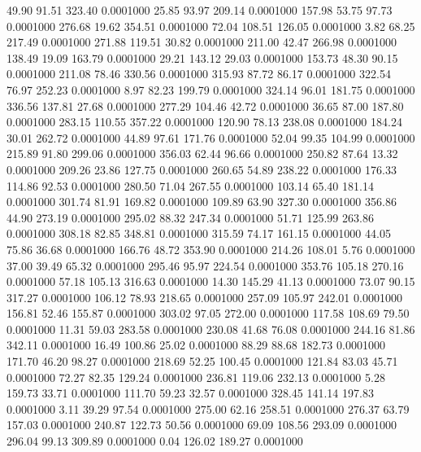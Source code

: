   49.90   91.51  323.40   0.0001000
  25.85   93.97  209.14   0.0001000
 157.98   53.75   97.73   0.0001000
 276.68   19.62  354.51   0.0001000
  72.04  108.51  126.05   0.0001000
   3.82   68.25  217.49   0.0001000
 271.88  119.51   30.82   0.0001000
 211.00   42.47  266.98   0.0001000
 138.49   19.09  163.79   0.0001000
  29.21  143.12   29.03   0.0001000
 153.73   48.30   90.15   0.0001000
 211.08   78.46  330.56   0.0001000
 315.93   87.72   86.17   0.0001000
 322.54   76.97  252.23   0.0001000
   8.97   82.23  199.79   0.0001000
 324.14   96.01  181.75   0.0001000
 336.56  137.81   27.68   0.0001000
 277.29  104.46   42.72   0.0001000
  36.65   87.00  187.80   0.0001000
 283.15  110.55  357.22   0.0001000
 120.90   78.13  238.08   0.0001000
 184.24   30.01  262.72   0.0001000
  44.89   97.61  171.76   0.0001000
  52.04   99.35  104.99   0.0001000
 215.89   91.80  299.06   0.0001000
 356.03   62.44   96.66   0.0001000
 250.82   87.64   13.32   0.0001000
 209.26   23.86  127.75   0.0001000
 260.65   54.89  238.22   0.0001000
 176.33  114.86   92.53   0.0001000
 280.50   71.04  267.55   0.0001000
 103.14   65.40  181.14   0.0001000
 301.74   81.91  169.82   0.0001000
 109.89   63.90  327.30   0.0001000
 356.86   44.90  273.19   0.0001000
 295.02   88.32  247.34   0.0001000
  51.71  125.99  263.86   0.0001000
 308.18   82.85  348.81   0.0001000
 315.59   74.17  161.15   0.0001000
  44.05   75.86   36.68   0.0001000
 166.76   48.72  353.90   0.0001000
 214.26  108.01    5.76   0.0001000
  37.00   39.49   65.32   0.0001000
 295.46   95.97  224.54   0.0001000
 353.76  105.18  270.16   0.0001000
  57.18  105.13  316.63   0.0001000
  14.30  145.29   41.13   0.0001000
  73.07   90.15  317.27   0.0001000
 106.12   78.93  218.65   0.0001000
 257.09  105.97  242.01   0.0001000
 156.81   52.46  155.87   0.0001000
 303.02   97.05  272.00   0.0001000
 117.58  108.69   79.50   0.0001000
  11.31   59.03  283.58   0.0001000
 230.08   41.68   76.08   0.0001000
 244.16   81.86  342.11   0.0001000
  16.49  100.86   25.02   0.0001000
  88.29   88.68  182.73   0.0001000
 171.70   46.20   98.27   0.0001000
 218.69   52.25  100.45   0.0001000
 121.84   83.03   45.71   0.0001000
  72.27   82.35  129.24   0.0001000
 236.81  119.06  232.13   0.0001000
   5.28  159.73   33.71   0.0001000
 111.70   59.23   32.57   0.0001000
 328.45  141.14  197.83   0.0001000
   3.11   39.29   97.54   0.0001000
 275.00   62.16  258.51   0.0001000
 276.37   63.79  157.03   0.0001000
 240.87  122.73   50.56   0.0001000
  69.09  108.56  293.09   0.0001000
 296.04   99.13  309.89   0.0001000
   0.04  126.02  189.27   0.0001000
